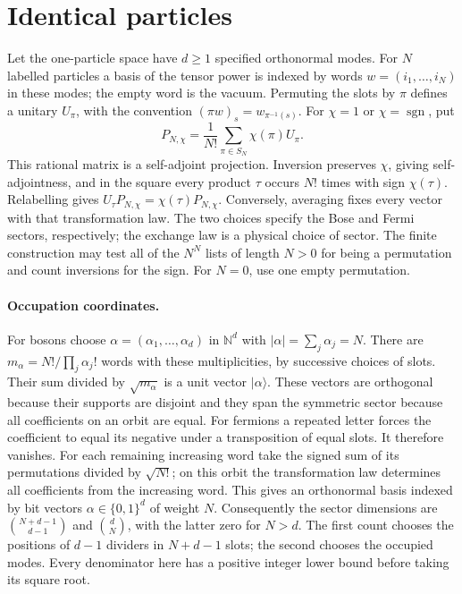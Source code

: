 \section{Identical particles}
\label{sec:q-identical}

Let the one-particle space have \(d\ge1\) specified orthonormal modes.
For \(N\) labelled particles a basis of the tensor power is indexed by
words \(w=(i_1,\ldots,i_N)\) in these modes; the empty word is the
vacuum. Permuting the slots by \(\pi\) defines a unitary \(U_\pi\),
with the convention \((\pi w)_s=w_{\pi^{-1}(s)}\).
For \(\chi=1\) or \(\chi=\operatorname{sgn}\), put
\[
               P_{N,\chi}=\frac1{N!}\sum_{\pi\in S_N}\chi(\pi)U_\pi .
\]
This rational matrix is a self-adjoint projection. Inversion preserves
\(\chi\), giving self-adjointness, and in the square every product
\(\tau\) occurs \(N!\) times with sign \(\chi(\tau)\).
Relabelling gives \(U_\tau P_{N,\chi}=\chi(\tau)P_{N,\chi}\).
Conversely, averaging fixes every vector with that transformation law.
The two choices specify the Bose and Fermi sectors, respectively; the
exchange law is a physical choice of sector. The finite construction may
test all of the \(N^N\) lists of length \(N>0\) for being a permutation
and count inversions for the sign. For \(N=0\), use one empty permutation.

\paragraph{Occupation coordinates.}
For bosons choose \(\alpha=(\alpha_1,\ldots,\alpha_d)\) in
\(\mathbb N^d\) with \(|\alpha|=\sum_j\alpha_j=N\).
There are \(m_\alpha=N!/\prod_j \alpha_j!\) words with these
multiplicities, by successive choices of slots. Their sum divided by
\(\sqrt{m_\alpha}\) is a unit vector \(|\alpha\rangle\).
These vectors are orthogonal because their supports are disjoint and
they span the symmetric sector because all coefficients on an orbit
are equal. For fermions a repeated letter forces the coefficient to
equal its negative under a transposition of equal slots. It therefore
vanishes. For each remaining increasing word take the signed sum of
its permutations divided by \(\sqrt{N!}\); on this orbit the
transformation law determines all coefficients from the increasing
word. This gives an orthonormal basis indexed by bit vectors
\(\alpha\in\{0,1\}^d\) of weight \(N\).
Consequently the sector dimensions are \({N+d-1\choose d-1}\) and
\({d\choose N}\), with the latter zero for \(N>d\). The first count
chooses the positions of \(d-1\) dividers in \(N+d-1\) slots; the
second chooses the occupied modes. Every denominator here has a positive
integer lower bound before taking its square root.

